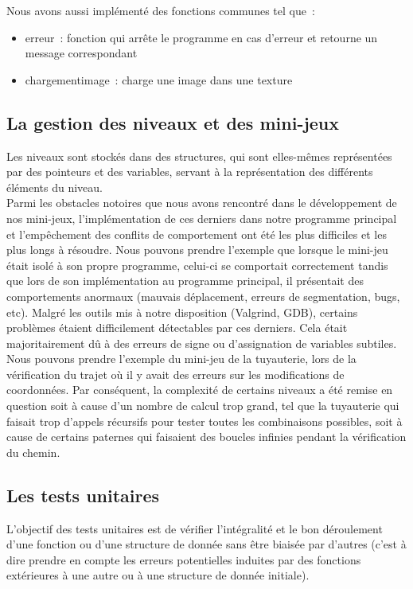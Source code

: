\documentclass[12pt,a4paper]{article}
\begin{document}
            Nous avons aussi implémenté des fonctions communes tel que~:\\
            
            \begin{itemize}
                \item erreur~: fonction qui arrête le programme en cas d’erreur et retourne un message correspondant
                \item chargement\textunderscore image~: charge une image dans une texture
            \end{itemize}

        \newpage
        
         \subsection{La gestion des niveaux et des mini-jeux}   
            \tabto{1cm} Les niveaux sont stockés dans des structures, qui sont elles-mêmes représentées par des pointeurs et des variables, servant à la représentation des différents éléments du niveau.\\

            \tabto{1cm} Parmi les obstacles notoires que nous avons rencontré dans le développement de nos mini-jeux, l’implémentation de ces derniers dans notre programme principal et l'empêchement des conflits de comportement ont été les plus difficiles et les plus longs à résoudre. Nous pouvons prendre l'exemple que lorsque le mini-jeu était isolé à son propre programme, celui-ci se comportait correctement tandis que lors de son implémentation au programme principal, il présentait des comportements anormaux (mauvais déplacement, erreurs de segmentation, bugs, etc). Malgré les outils mis à notre disposition (Valgrind, GDB), certains problèmes étaient difficilement détectables par ces derniers. Cela était majoritairement dû à des erreurs de signe ou d’assignation de variables subtiles. Nous pouvons prendre l'exemple du mini-jeu de la tuyauterie, lors de la vérification du trajet où il y avait des erreurs sur les modifications de coordonnées. Par conséquent, la complexité de certains niveaux a été remise en question soit à cause d’un nombre de calcul trop grand, tel que la tuyauterie qui faisait trop d’appels récursifs pour tester toutes les combinaisons possibles, soit à cause de certains paternes qui faisaient des boucles infinies pendant la vérification du chemin.
            
         \subsection{Les tests unitaires}
            \tabto{1cm} L’objectif des tests unitaires est de vérifier l’intégralité et le bon déroulement d’une fonction ou d’une structure de donnée sans être biaisée par d’autres (c’est à dire prendre en compte les erreurs potentielles induites par des fonctions extérieures à une autre ou à une structure de donnée initiale).
\end{document}

